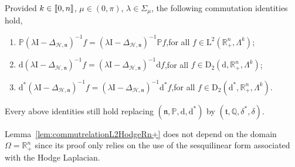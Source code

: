 \documentclass[AHL,Unicode,longabstracts,published]{cedram}
\newcommand{\bbP}{\mathbb{P}}
\newcommand{\bbR}{\mathbb{R}}
\newcommand{\bbQ}{\mathbb{Q}}
\newcommand{\rmd}{\mathrm{d}}
\newcommand{\rmD}{\mathrm{D}}
\newcommand{\rmL}{\mathrm{L}}
\newcommand{\rmI}{\mathrm{I}}
\newcommand{\clH}{\mathcal{H}}
\newcommand{\fkn}{\mathfrak{n}}
\newcommand{\fkt}{\mathfrak{t}}
\newcommand{\llbracket}{\mathopen{[\mkern -2.7mu[}}
\newcommand{\rrbracket}{\mathclose{]\mkern -2.7mu]}}
\newcommand{\llb}{\llbracket}
\newcommand{\rrb}{\rrbracket}
\begin{document}
\begin{lemm}\label{lem:commutrelationL2HodgeRn+}
Provided $k\in\llb 0,n\rrb$, $\mu\in(0,\pi)$, $\lambda\in\Sigma_\mu$, the following commutation identities hold,
\begin{enumerate}
\item $\bbP(\lambda \rmI  - \Delta_{\clH,\fkn})^{-1}f = (\lambda \rmI  - \Delta_{\clH,\fkn})^{-1}\bbP f$,\qquad for all $f\in\rmL^2(\bbR^n_+,\Lambda^k)$;
\item $\rmd(\lambda \rmI  - \Delta_{\clH,\fkn})^{-1}f = (\lambda \rmI  - \Delta_{\clH,\fkn})^{-1}\rmd f$,\qquad for all $f\in\rmD_2(\rmd,\bbR^n_+,\Lambda^k)$;
\item $\rmd^\ast(\lambda \rmI  - \Delta_{\clH,\fkn})^{-1}f = (\lambda \rmI  - \Delta_{\clH,\fkn})^{-1}\rmd^\ast f$,\qquad for all $f\in\rmD_2(\rmd^\ast,\bbR^n_+,\Lambda^k)$.
\end{enumerate}
Every above identities still hold replacing $(\fkn,\bbP,\rmd,\rmd^\ast)$ by $(\fkt,\bbQ,\delta^\ast,\delta)$.
\end{lemm}

\begin{rema}
Lemma~\ref{lem:commutrelationL2HodgeRn+} does not depend on the domain $\Omega=\bbR^n_+$ since its proof only relies on the use of the sesquilinear form associated with the Hodge Laplacian.
\end{rema}
\end{document}
